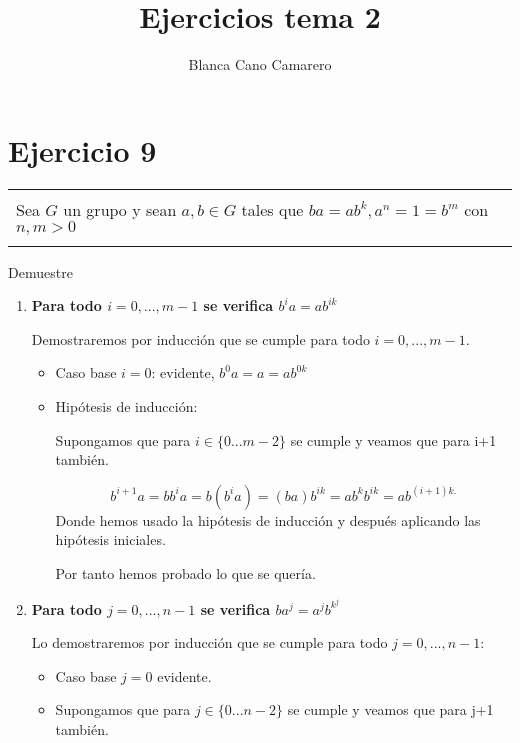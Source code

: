 \documentclass[12pt]{article}
\title{Ejercicios tema 2}
\author{Blanca Cano Camarero}
\newenvironment{micaja}
{
    \begin{center}
    \begin{tabular}{|p{0.9\textwidth}|}
    \hline\\
    }   
    {   
    \\\\\hline
    \end{tabular} 
    \end{center}
    }
\begin{document}
\begin{titlepage}
\maketitle
\tableofcontents
\end{titlepage}

\section[Ejercicio 9]{Ejercicio 9}
\begin{micaja}
Sea $G$ un grupo y sean $a,b \in G$ tales que $ba = ab^k , a^n = 1 = b^m$
con $n,m>0$
\end{micaja}

Demuestre 
\begin{enumerate}
 
    \item \textbf{Para todo $i=0,...,m-1$ se verifica $b^i a = a b^{ik}$}
    
    Demostraremos por inducción que se cumple para todo $i=0,...,m-1$.

    \begin{itemize}
        \item Caso base $i = 0$: evidente,  $b^0 a = a = a b^{0k}$
        \item Hipótesis de inducción: 
        
        Supongamos que para $i \in \{0...m-2\}$ se cumple y veamos que para i+1 también.
        
        $$b^{i+1} a = b b^i a = b (b^i a) = (b a) b^{ik}  = a  b^k b^{ik} = a b^{(i+1)k.}$$  
        Donde hemos usado la hipótesis de inducción y después aplicando las 
        hipótesis iniciales.
        
        Por tanto hemos probado lo que se quería.
    \end{itemize}  

    \item \textbf{Para todo $j  = 0,...,n-1$ se verifica $b a^j = a^j b^{k^j}$}
    
    Lo demostraremos por  inducción que se cumple para todo $j=0,...,n-1$: 

    \begin{itemize}
        \item Caso base $j = 0$ evidente.
        \item Supongamos que para $j \in \{0...n-2\}$ 
        se cumple y veamos que para j+1 también.
    

\end{itemize}
\end{enumerate}
\end{document}
